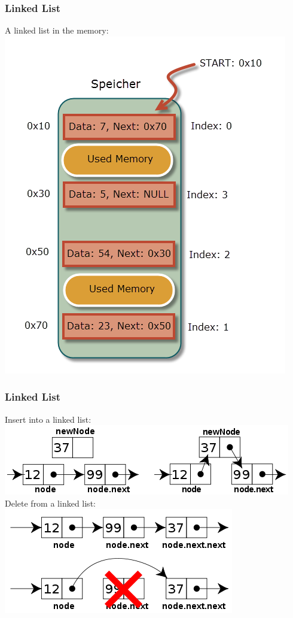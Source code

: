 \begin{frame}[fragile]
\frametitle{Linked List}
A linked list in the memory:\\
\vspace{1mm}
\includegraphics[scale=0.35]{img/linkedlist.png}
\end{frame}

\begin{frame}[fragile]
\frametitle{Linked List}
Insert into a linked list:\\
\vspace{1mm}
\includegraphics[scale=0.3]{img/linkedlist_insert2.png}\\
\vspace{5mm}
Delete from a linked list:\\
\vspace{1mm}
\includegraphics[scale=0.3]{img/linkedlist_remove2.png}
\end{frame}

